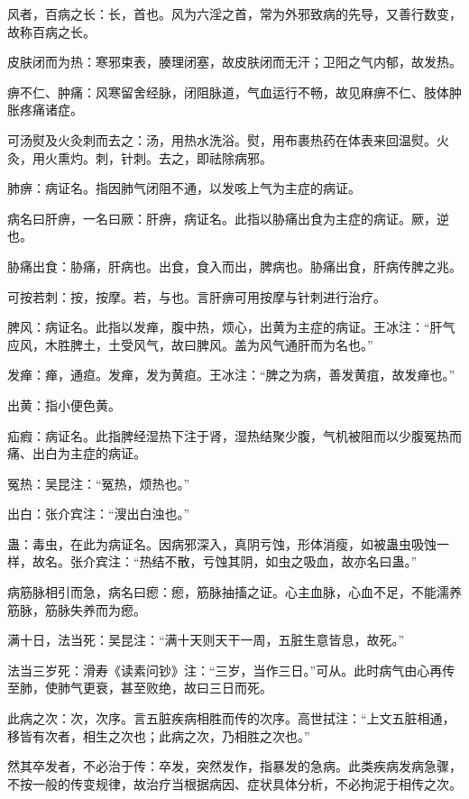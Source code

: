 \documentclass[draft,12pt]{ctexbook}
\begin{document}

\begin{jiaozhu}
  \item 风者，百病之长：长，首也。风为六淫之首，常为外邪致病的先导，又善行数变，故称百病之长。
  \item 皮肤闭而为热：寒邪束表，腠理闭塞，故皮肤闭而无汗；卫阳之气内郁，故发热。
  \item 痹不仁、肿痛：风寒留舍经脉，闭阻脉道，气血运行不畅，故见麻痹不仁、肢体肿胀疼痛诸症。
  \item 可汤熨及火灸刺而去之：汤，用热水洗浴。熨，用布裹热药在体表来回温熨。火灸，用火熏灼。刺，针刺。去之，即祛除病邪。
  \item 肺痹：病证名。指因肺气闭阻不通，以发咳上气为主症的病证。
  \item 病名曰肝痹，一名曰厥：肝痹，病证名。此指以胁痛出食为主症的病证。厥，逆也。
  \item 胁痛出食：胁痛，肝病也。出食，食入而出，脾病也。胁痛出食，肝病传脾之兆。
  \item 可按若刺：按，按摩。若，与也。言肝痹可用按摩与针刺进行治疗。
  \item 脾风：病证名。此指以发瘅，腹中热，烦心，出黄为主症的病证。王冰注：“肝气应风，木胜脾土，土受风气，故曰脾风。盖为风气通肝而为名也。”
  \item 发瘅：瘅，通疸。发瘅，发为黄疸。王冰注：“脾之为病，善发黄疽，故发瘅也。”
  \item 出黄：指小便色黄。
  \item 疝瘕：病证名。此指脾经湿热下注于肾，湿热结聚少腹，气机被阻而以少腹冤热而痛、出白为主症的病证。
  \item 冤热：吴昆注：“冤热，烦热也。”
  \item 出白：张介宾注：“溲出白浊也。”
  \item 蛊：毒虫，在此为病证名。因病邪深入，真阴亏蚀，形体消瘦，如被蛊虫吸蚀一样，故名。张介宾注：“热结不散，亏蚀其阴，如虫之吸血，故亦名曰蛊。”
  \item 病筋脉相引而急，病名曰瘛：瘛，筋脉抽搐之证。心主血脉，心血不足，不能濡养筋脉，筋脉失养而为瘛。
  \item 满十日，法当死：吴昆注：“满十天则天干一周，五脏生意皆息，故死。”
  \item 法当三岁死：滑寿《读素问钞》注：“三岁，当作三日。”可从。此时病气由心再传至肺，使肺气更衰，甚至败绝，故曰三日而死。
  \item 此病之次：次，次序。言五脏疾病相胜而传的次序。高世拭注：“上文五脏相通，移皆有次者，相生之次也；此病之次，乃相胜之次也。”
  \item 然其卒发者，不必治于传：卒发，突然发作，指暴发的急病。此类疾病发病急骤，不按一般的传变规律，故治疗当根据病因、症状具体分析，不必拘泥于相传之次。

\end{jiaozhu}
\end{document}
